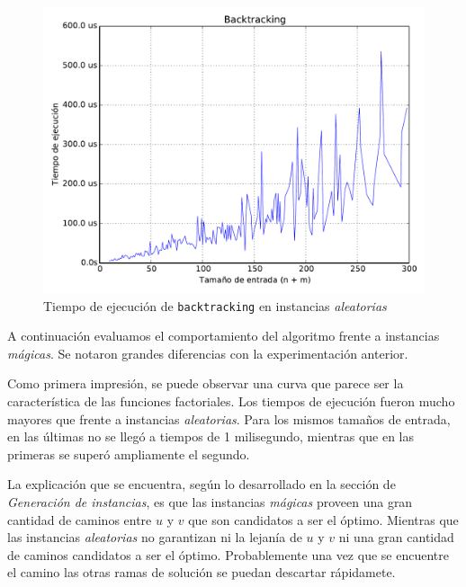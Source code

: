 \begin{figure}[H]
    \begin{center}
        \includegraphics[width=\textwidth]{imagenes/backtracking-complejidad-random.pdf}
        \caption{Tiempo de ejecución de \texttt{backtracking} en instancias \textit{aleatorias}}
    \end{center}
\end{figure}

\newpage
A continuación evaluamos el comportamiento del algoritmo frente a instancias \textit{mágicas}. Se notaron grandes diferencias con la experimentación anterior.

Como primera impresión, se puede observar una curva que parece ser la característica de las funciones factoriales. Los tiempos de ejecución fueron mucho mayores que frente a instancias \textit{aleatorias}. Para los mismos tamaños de entrada, en las últimas no se llegó a tiempos de 1 milisegundo, mientras que en las primeras se superó ampliamente el segundo.

La explicación que se encuentra, según lo desarrollado en la sección de \textit{Generación de instancias}, es que las instancias \textit{mágicas} proveen una gran cantidad de caminos entre $u$ y $v$ que son candidatos a ser el óptimo. Mientras que las instancias \textit{aleatorias} no garantizan ni la lejanía de $u$ y $v$ ni una gran cantidad de caminos candidatos a ser el óptimo. Probablemente una vez que se encuentre el camino las otras ramas de solución se puedan descartar rápidamete.

